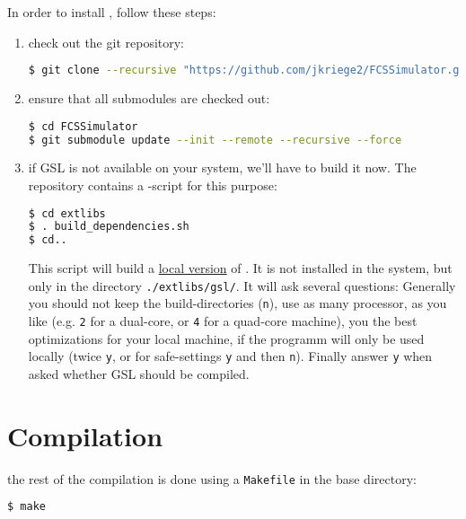 \noindent In order to install \df, follow these steps:
\begin{enumerate}
	\item check out the git repository: 
	  \begin{lstlisting}[language=bash] 
$ git clone --recursive "https://github.com/jkriege2/FCSSimulator.git"
		\end{lstlisting}
	\item ensure that all submodules are checked out: 
	  \begin{lstlisting}[language=bash] 
$ cd FCSSimulator
$ git submodule update --init --remote --recursive --force
		\end{lstlisting}
	\item if GSL is not available on your system, we'll have to build it now. The repository contains a \bash-script for this purpose: 
	  \begin{lstlisting}[language=bash] 
$ cd extlibs
$ . build_dependencies.sh
$ cd..
		\end{lstlisting}
		This script will build a \underline{local version} of \GSL. It is not installed in the system, but only in the directory \texttt{./extlibs/gsl/}. It will ask several questions: Generally you should not keep the build-directories (\texttt{n}), use as many processor, as you like (e.g. \texttt{2} for a dual-core, or \texttt{4} for a quad-core machine), you the best optimizations for your local machine, if the programm will only be used locally (twice \texttt{y}, or for safe-settings \texttt{y} and then \texttt{n}). Finally answer \texttt{y} when asked whether GSL should be compiled.
\end{enumerate}

\section{Compilation}
\label{sec:Compilation}
the rest of the compilation is done using a \texttt{Makefile} in the base directory:
\begin{lstlisting}[language=bash] 
$ make 
\end{lstlisting}

